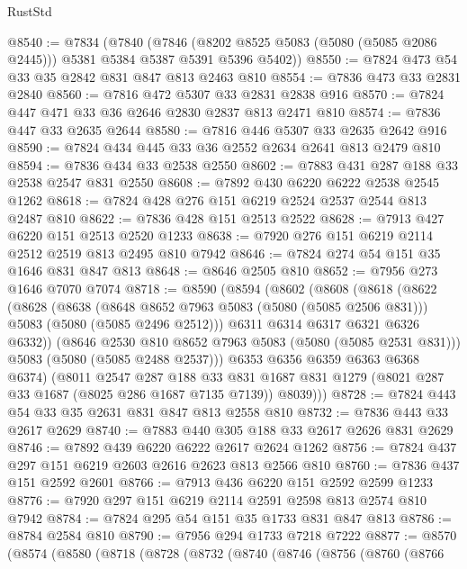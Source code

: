\begin{lexlean}{RustStd}
\begin{coremodule}
{\begin{coremodule}
{{{{{@8540 := @7834
    (@7840
      (@7846 (@8202 @8525 @5083 (@5080 (@5085 @2086 @2445))) @5381 @5384 @5387 @5391 @5396 @5402))
@8550 := @7824 @473 @54 @33 @35 @2842 @831 @847 @813 @2463 @810
@8554 := @7836 @473 @33 @2831 @2840
@8560 := @7816 @472 @5307 @33 @2831 @2838 @916
@8570 := @7824 @447 @471 @33 @36 @2646 @2830 @2837 @813 @2471 @810
@8574 := @7836 @447 @33 @2635 @2644
@8580 := @7816 @446 @5307 @33 @2635 @2642 @916
@8590 := @7824 @434 @445 @33 @36 @2552 @2634 @2641 @813 @2479 @810
@8594 := @7836 @434 @33 @2538 @2550
@8602 := @7883 @431 @287 @188 @33 @2538 @2547 @831 @2550
@8608 := @7892 @430 @6220 @6222 @2538 @2545 @1262
@8618 := @7824 @428 @276 @151 @6219 @2524 @2537 @2544 @813 @2487 @810
@8622 := @7836 @428 @151 @2513 @2522
@8628 := @7913 @427 @6220 @151 @2513 @2520 @1233
@8638 := @7920 @276 @151 @6219 @2114 @2512 @2519 @813 @2495 @810 @7942
@8646 := @7824 @274 @54 @151 @35 @1646 @831 @847 @813
@8648 := @8646 @2505 @810
@8652 := @7956 @273 @1646 @7070 @7074
@8718 := @8590
    (@8594
      (@8602
        (@8608
          (@8618
            (@8622
              (@8628
                (@8638
                  (@8648 @8652 @7963 @5083 (@5080 (@5085 @2506 @831)))
                  @5083
                  (@5080 (@5085 @2496 @2512)))
                @6311
                @6314
                @6317
                @6321
                @6326
                @6332))
            (@8646 @2530 @810 @8652 @7963 @5083 (@5080 (@5085 @2531 @831)))
            @5083
            (@5080 (@5085 @2488 @2537)))
          @6353
          @6356
          @6359
          @6363
          @6368
          @6374)
        (@8011
          @2547
          @287
          @188
          @33
          @831
          @1687
          @831
          @1279
          (@8021 @287 @33 @1687 (@8025 @286 @1687 @7135 @7139))
          @8039)))
@8728 := @7824 @443 @54 @33 @35 @2631 @831 @847 @813 @2558 @810
@8732 := @7836 @443 @33 @2617 @2629
@8740 := @7883 @440 @305 @188 @33 @2617 @2626 @831 @2629
@8746 := @7892 @439 @6220 @6222 @2617 @2624 @1262
@8756 := @7824 @437 @297 @151 @6219 @2603 @2616 @2623 @813 @2566 @810
@8760 := @7836 @437 @151 @2592 @2601
@8766 := @7913 @436 @6220 @151 @2592 @2599 @1233
@8776 := @7920 @297 @151 @6219 @2114 @2591 @2598 @813 @2574 @810 @7942
@8784 := @7824 @295 @54 @151 @35 @1733 @831 @847 @813
@8786 := @8784 @2584 @810
@8790 := @7956 @294 @1733 @7218 @7222
@8877 := @8570
    (@8574
      (@8580
        (@8718
          (@8728
            (@8732
              (@8740
                (@8746
                  (@8756
                    (@8760
                      (@8766
}}}}}
\end{coremodule}}
\end{coremodule}
\end{lexlean}
